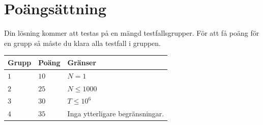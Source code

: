 \section*{Poängsättning}
Din lösning kommer att testas på en mängd testfallsgrupper.
För att få poäng för en grupp så måste du klara alla testfall i gruppen.

\noindent
\begin{tabular}{| l | l | p{12cm} |}
  \hline
  \textbf{Grupp} & \textbf{Poäng} & \textbf{Gränser} \\ \hline
  $1$    & $10$       & $N=1$ \\ \hline
  $2$    & $25$       & $N \leq 1000$ \\ \hline
  $3$    & $30$       & $T \leq 10^6$ \\ \hline
  $4$    & $35$       & Inga ytterligare begränsningar. \\ \hline
\end{tabular}